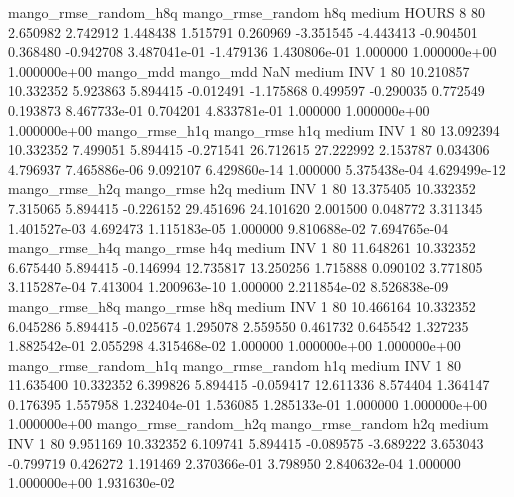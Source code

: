mango_rmse_random_h8q mango_rmse_random                  h8q     medium    HOURS                 8 80  2.650982       2.742912 1.448438       1.515791    0.260969     -3.351545     -4.443413    -0.904501       0.368480 -0.942708 3.487041e-01    -1.479136   1.430806e-01            1.000000    1.000000e+00        1.000000e+00
            mango_mdd         mango_mdd                  NaN     medium      INV                 1 80 10.210857      10.332352 5.923863       5.894415   -0.012491     -1.175868      0.499597    -0.290035       0.772549  0.193873 8.467733e-01     0.704201   4.833781e-01            1.000000    1.000000e+00        1.000000e+00
       mango_rmse_h1q        mango_rmse                  h1q     medium      INV                 1 80 13.092394      10.332352 7.499051       5.894415   -0.271541     26.712615     27.222992     2.153787       0.034306  4.796937 7.465886e-06     9.092107   6.429860e-14            1.000000    5.375438e-04        4.629499e-12
       mango_rmse_h2q        mango_rmse                  h2q     medium      INV                 1 80 13.375405      10.332352 7.315065       5.894415   -0.226152     29.451696     24.101620     2.001500       0.048772  3.311345 1.401527e-03     4.692473   1.115183e-05            1.000000    9.810688e-02        7.694765e-04
       mango_rmse_h4q        mango_rmse                  h4q     medium      INV                 1 80 11.648261      10.332352 6.675440       5.894415   -0.146994     12.735817     13.250256     1.715888       0.090102  3.771805 3.115287e-04     7.413004   1.200963e-10            1.000000    2.211854e-02        8.526838e-09
       mango_rmse_h8q        mango_rmse                  h8q     medium      INV                 1 80 10.466164      10.332352 6.045286       5.894415   -0.025674      1.295078      2.559550     0.461732       0.645542  1.327235 1.882542e-01     2.055298   4.315468e-02            1.000000    1.000000e+00        1.000000e+00
mango_rmse_random_h1q mango_rmse_random                  h1q     medium      INV                 1 80 11.635400      10.332352 6.399826       5.894415   -0.059417     12.611336      8.574404     1.364147       0.176395  1.557958 1.232404e-01     1.536085   1.285133e-01            1.000000    1.000000e+00        1.000000e+00
mango_rmse_random_h2q mango_rmse_random                  h2q     medium      INV                 1 80  9.951169      10.332352 6.109741       5.894415   -0.089575     -3.689222      3.653043    -0.799719       0.426272  1.191469 2.370366e-01     3.798950   2.840632e-04            1.000000    1.000000e+00        1.931630e-02
